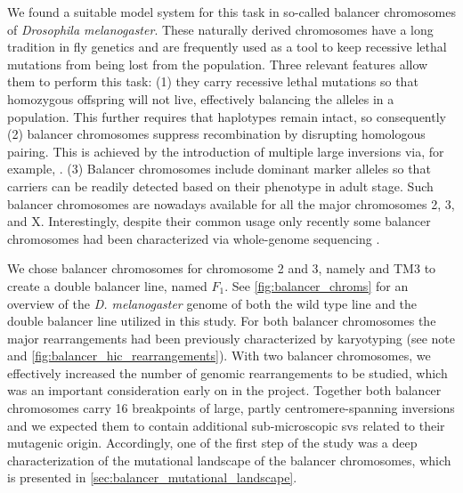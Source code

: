 We found a suitable model system for this task in so-called balancer chromosomes
of \textit{Drosophila melanogaster}. These naturally derived chromosomes have a
long tradition in fly genetics and are frequently used as a tool to keep
recessive lethal mutations from being lost from the population. Three relevant
features allow them to perform this task: (1) they carry recessive lethal
mutations so that homozygous offspring will not live, effectively balancing the
alleles in a population. This further requires that haplotypes remain intact,
so consequently (2) balancer chromosomes
suppress recombination by disrupting homologous pairing. This is achieved by the
introduction of multiple large inversions via, for example,
.
(3) Balancer chromosomes include dominant marker alleles so that carriers can be
readily detected based on their phenotype in adult stage. Such balancer
chromosomes are nowadays available for all the major chromosomes 2, 3, and X.
Interestingly, despite their common usage only recently some balancer
chromosomes had been characterized via whole-genome sequencing \citep{Miller2016,Miller2018}.

We chose balancer chromosomes for chromosome 2 and 3, namely 
and TM3 \citep{Tinderholt1960} to create a double balancer line, named $F_1$.
See \cref{fig:balancer_chroms} for an overview of the \textit{D. melanogaster}
genome of both the wild type line and the double balancer line utilized in this
study. For both balancer chromosomes the major rearrangements had been
previously characterized by karyotyping (see
note and
\cref{fig:balancer_hic_rearrangements}). With two balancer chromosomes,
we effectively increased the number of genomic rearrangements to
be studied, which was an important consideration early on in the project.
Together both balancer chromosomes carry 16 breakpoints of large, partly
centromere-spanning inversions and we expected them to contain additional
sub-microscopic \acp{sv} related to their mutagenic origin. Accordingly, one of
the first step of the study was a deep characterization of the mutational
landscape  of the balancer chromosomes, which is presented in
\cref{sec:balancer_mutational_landscape}.





